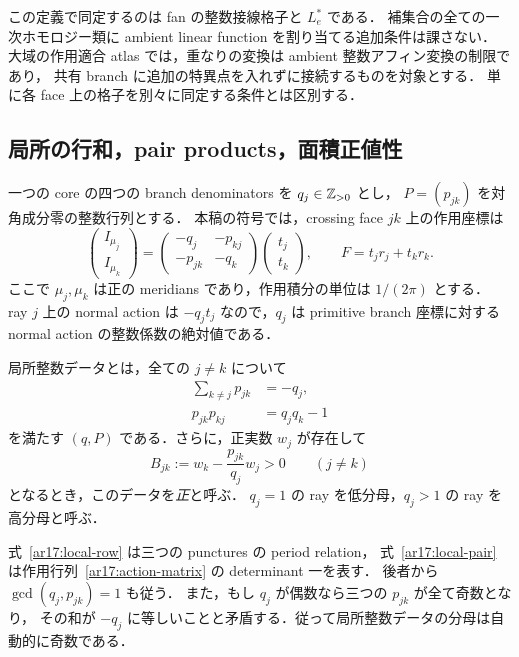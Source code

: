 この定義で同定するのは fan の整数接線格子と $L_e^*$ である．
補集合の全ての一次ホモロジー類に ambient linear function を割り当てる追加条件は課さない．
大域の作用適合 atlas では，重なりの変換は ambient 整数アフィン変換の制限であり，
共有 branch に追加の特異点を入れずに接続するものを対象とする．
単に各 face 上の格子を別々に同定する条件とは区別する．

\subsection{局所の行和，pair products，面積正値性}

一つの core の四つの branch denominators を $q_j\in\mathbb Z_{>0}$ とし，
$P=(p_{jk})$ を対角成分零の整数行列とする．
本稿の符号では，crossing face $jk$ 上の作用座標は
\begin{equation}\label{ar17:action-matrix}
 \begin{pmatrix}I_{\mu_j}\\ I_{\mu_k}\end{pmatrix}
 =\begin{pmatrix}-q_j&-p_{kj}\\-p_{jk}&-q_k\end{pmatrix}
   \begin{pmatrix}t_j\\t_k\end{pmatrix},\qquad
 F=t_jr_j+t_kr_k.
\end{equation}
ここで $\mu_j,\mu_k$ は正の meridians であり，作用積分の単位は $1/(2\pi)$ とする．
ray $j$ 上の normal action は $-q_jt_j$ なので，$q_j$ は
primitive branch 座標に対する normal action の整数係数の絶対値である．

\begin{definition}[局所整数データと正値性]
\label{ar17:local-data}
局所整数データとは，全ての $j\ne k$ について
\begin{align}
 \sum_{k\ne j}p_{jk}&=-q_j,\label{ar17:local-row}\\
 p_{jk}p_{kj}&=q_jq_k-1\label{ar17:local-pair}
\end{align}
を満たす $(q,P)$ である．さらに，正実数 $w_j$ が存在して
\begin{equation}\label{ar17:local-positive}
 B_{jk}:=w_k-\frac{p_{jk}}{q_j}w_j>0\qquad(j\ne k)
\end{equation}
となるとき，このデータを\emph{正}と呼ぶ．
$q_j=1$ の ray を低分母，$q_j>1$ の ray を高分母と呼ぶ．
\end{definition}

式~\eqref{ar17:local-row} は三つの punctures の period relation，
式~\eqref{ar17:local-pair} は作用行列~\eqref{ar17:action-matrix} の determinant 一を表す．
後者から $\gcd(q_j,p_{jk})=1$ も従う．
また，もし $q_j$ が偶数なら三つの $p_{jk}$ が全て奇数となり，
その和が $-q_j$ に等しいことと矛盾する．従って局所整数データの分母は自動的に奇数である．

